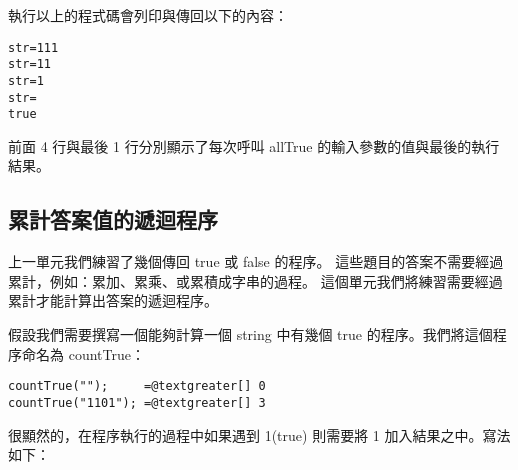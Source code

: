 \documentclass[a4paper,12pt,english]{sphinxmanual}
\begin{document}
執行以上的程式碼會列印與傳回以下的內容：

\begin{Verbatim}[commandchars=@\[\]]
str=111
str=11
str=1
str=
true
\end{Verbatim}

前面 4 行與最後 1 行分別顯示了每次呼叫 allTrue 的輸入參數的值與最後的執行結果。


\subsection{累計答案值的遞迴程序}
\label{java_loop:id6}
上一單元我們練習了幾個傳回 true 或 false 的程序。
這些題目的答案不需要經過累計，例如：累加、累乘、或累積成字串的過程。
這個單元我們將練習需要經過累計才能計算出答案的遞迴程序。

假設我們需要撰寫一個能夠計算一個 string 中有幾個 true 的程序。我們將這個程序命名為 countTrue：

\begin{Verbatim}[commandchars=@\[\]]
countTrue("");     =@textgreater[] 0
countTrue("1101"); =@textgreater[] 3
\end{Verbatim}

很顯然的，在程序執行的過程中如果遇到 1(true) 則需要將 1 加入結果之中。寫法如下：
\end{document}

